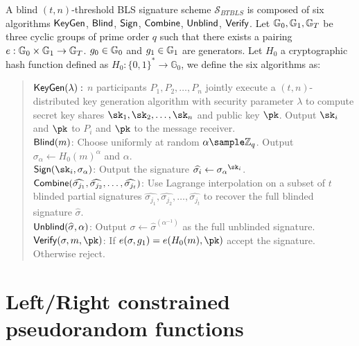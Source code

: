 \begin{definition}\label{def:BTBLS} A blind $(t,n)$-threshold BLS signature scheme $\mathcal{S}_{BTBLS}$ is composed of six algorithms $\mathsf{KeyGen}$, $\mathsf{Blind}$, $\mathsf{Sign}$, $\mathsf{Combine}$, $\mathsf{Unblind}$, $\mathsf{Verify}$. Let $\mathbb{G}_0, \mathbb{G}_1, \mathbb{G}_T$ be three cyclic groups of prime order $q$ such that there exists a pairing $e : \mathbb{G}_0 \times \mathbb{G}_1 \rightarrow \mathbb{G}_T$. $g_0 \in \mathbb{G}_0$ and $g_1 \in \mathbb{G}_1$ are generators. Let $H_0$ a cryptographic hash function defined as $H_0: \{0,1\}^* \rightarrow \mathbb{G}_0$, we define the six algorithms as:
	
	\begin{quote}
		$\mathsf{KeyGen}(\lambda):$ $n$ participants $P_1, P_2, \dots, P_n$ jointly execute a $(t,n)$-distributed key generation algorithm with security parameter $\lambda$ to compute secret key shares $\sk_1, \sk_2, \dots, \sk_n$ and public key $\pk$. Output $\sk_i$ and $\pk$ to $P_i$ and $\pk$ to the message receiver.\\
		$\mathsf{Blind}(m)$: Choose uniformly at random $\alpha \sample \mathbb{Z}_q$. Output $\sigma_\alpha \leftarrow H_0(m)^\alpha$ and $\alpha$. \\
		$\Sign(\sk_i, \sigma_\alpha)$: Output the signature $\widehat{\sigma_i} \leftarrow {\sigma_\alpha}^{\sk_i}$. \\
		$\mathsf{Combine}(\widehat{\sigma_{j_1}}, \widehat{\sigma_{j_2}}, \dots, \widehat{\sigma_{j_t}})$: Use Lagrange interpolation on a subset of $t$ blinded partial signatures $\widehat{\sigma_{j_1}}, \widehat{\sigma_{j_2}}, \dots, \widehat{\sigma_{j_t}}$ to recover the full blinded signature $\widehat \sigma$. \\
		$\mathsf{Unblind}(\widehat \sigma, \alpha)$: Output $\sigma \leftarrow \widehat \sigma^{(\alpha^{-1})} $ as the full unblinded signature. \\
		$\Verif(\sigma, m, \pk)$: If $e(\sigma, g_1) = e(H_0(m), \pk)$ accept the signature. Otherwise reject.
	\end{quote}
	
\end{definition}




\section{Left/Right constrained pseudorandom functions}

